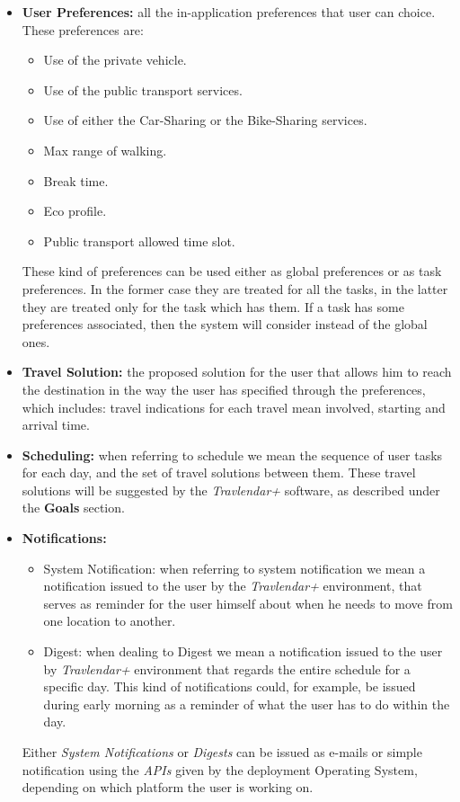 \begin{itemize}
    
    \item \textbf{User Preferences:} all the in-application preferences that user can choice. These preferences are: 
    \begin{itemize}
        \item Use of the private vehicle.
        \item Use of the public transport services.
        \item Use of either the Car-Sharing or the Bike-Sharing services.
        \item Max range of walking.
    	\item Break time.
    	\item Eco profile.
    	\item Public transport allowed time slot.
    \end{itemize}
    These kind of preferences can be used either as global preferences or as task preferences. In the former case they are treated for all the tasks, in the latter they are treated only for the task which has them.
    If a task has some preferences associated, then the system will consider instead of the global ones.
    
    \item \textbf{Travel Solution:} the proposed solution for the user that allows him to reach the destination in the way the user has specified through the preferences, which includes: travel indications for each travel mean involved, starting and arrival time.

    \item \textbf{Scheduling:} when referring to schedule we mean the sequence of user tasks for each day, and the set of travel solutions between them. These travel solutions will be suggested by the \emph{Travlendar+} software, as described under the \textbf{Goals} section. 
    
     \item \textbf{Notifications:}
     \begin{itemize}
     \item System Notification: when referring to system notification we mean a notification issued to the user by the \emph{Travlendar+} environment, that serves as reminder for the user himself about when he needs to move from one location to another. 
     \item Digest: when dealing to Digest we mean a notification issued to the user by \emph{Travlendar+} environment that regards the entire schedule for a specific day. This kind of notifications could, for example, be issued during early morning as a reminder of what the user has to do within the day.
     \end{itemize}
     Either \emph{System Notifications} or \emph{Digests} can be issued as e-mails or simple notification using the \emph{APIs} given by the deployment Operating System, depending on which platform the user is working on.   
     

\end{itemize}
